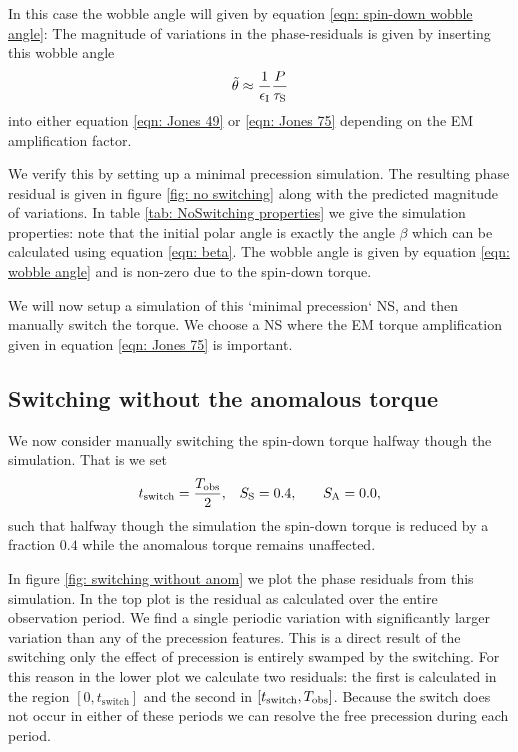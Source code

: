\documentclass[../full_thesis/full_thesis.tex]{subfiles}
\newcommand{\thisdir}{../inertial_frame}
\begin{document}
In this case the wobble angle will given by equation \eqref{eqn: spin-down wobble angle}:
The magnitude of variations in the phase-residuals is given by inserting this
wobble angle
\begin{equation}
\tilde{\theta} \approx \frac{1}{\epsilon_{\mathrm{I}}}{\frac{P}{\tau_{\mathrm{S}}}}
\end{equation} 
into either equation \eqref{eqn: Jones 49} or \eqref{eqn: Jones 75} depending 
on the EM amplification factor.

We verify this by setting up a minimal precession simulation. The resulting
phase residual is given in figure \ref{fig: no switching} along with the
predicted magnitude of variations. In table \ref{tab: NoSwitching properties}
we give the simulation properties: note that the initial polar angle is exactly
the angle $\beta$ which can be calculated using equation \eqref{eqn: beta}. 
The wobble angle is given by equation \eqref{eqn: wobble angle} and is non-zero
due to the spin-down torque. 

\begin{figure}[htb]
\begin{floatrow}
\capbtabbox{%
  
}{%
  \caption{}%
  \label{tab: NoSwitching properties}
}
\end{floatrow}
\end{figure}


We will now setup a simulation of this `minimal precession` NS, and then 
manually switch the torque. We choose a NS where the EM torque amplification
given in equation \eqref{eqn: Jones 75} is important.

\subsection{Switching without the anomalous torque}
We now consider manually switching the spin-down torque halfway though the simulation.
That is we set
\begin{align}
    t_{\mathrm{switch}} = \frac{T_{\textrm{obs}}}{2}, &&& S_{\mathrm{S}} = 0.4, &&& S_{\mathrm{A}} = 0.0,
\end{align}
such that halfway though the simulation the spin-down torque is reduced by a
fraction $0.4$ while the anomalous torque remains unaffected. 

In figure \ref{fig: switching without anom} we plot the phase residuals from
this simulation. In the top plot is the residual as calculated over the entire
observation period. We find a single periodic variation with significantly
larger variation than any of the precession features. This is a direct result
of the switching only%
the
effect of precession is entirely swamped by the switching. For this reason in
the lower plot we calculate two residuals: the first is calculated
in the region $[0, t_{\mathrm{switch}}]$ and the second in $[t_{\mathrm{switch}}, T_{\textrm{obs}}]$.
Because the switch does not occur in either of these periods we can resolve the
free precession during each period.
\end{document}
